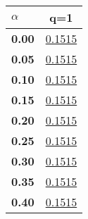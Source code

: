 \begin{tabular}{ | l || c |}
\hline
\textbf{$\alpha$} & \textbf{}q=1} \\
\hline
\textbf{0.00} & \underline{0.1515}\\
\hline
\textbf{0.05} & \underline{0.1515}\\
\hline
\textbf{0.10} & \underline{0.1515}\\
\hline
\textbf{0.15} & \underline{0.1515}\\
\hline
\textbf{0.20} & \underline{0.1515}\\
\hline
\textbf{0.25} & \underline{0.1515}\\
\hline
\textbf{0.30} & \underline{0.1515}\\
\hline
\textbf{0.35} & \underline{0.1515}\\
\hline
\textbf{0.40} & \underline{0.1515}\\
\hline
\end{tabular}
